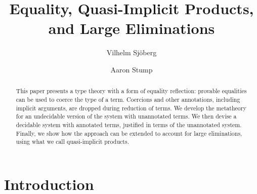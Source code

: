 \documentclass[copyright]{eptcs}
\begin{document}
\pagestyle{empty}


\newif \ifTR \TRfalse

\title{Equality, Quasi-Implicit Products, and Large Eliminations}
\author{Vilhelm Sj\"oberg
\and
Aaron Stump 
}

\date{}

\def\authorrunning{Sj\"oberg and Stump}
\def\titlerunning{Equality and Implicit Products}

\maketitle
\thispagestyle{empty}

\begin{abstract}
This paper presents a type theory with a form of equality reflection:
provable equalities can be used to coerce the type of a term.
Coercions and other annotations, including implicit arguments, are
dropped during reduction of terms.  We develop the metatheory for an
undecidable version of the system with unannotated terms.  We then
devise a decidable system with annotated terms, justified in terms of
the unannotated system.  Finally, we show how the approach can be
extended to account for large eliminations, using what we call
quasi-implicit products.
\end{abstract}

\section{Introduction}
\label{sec:intro}
\end{document}
